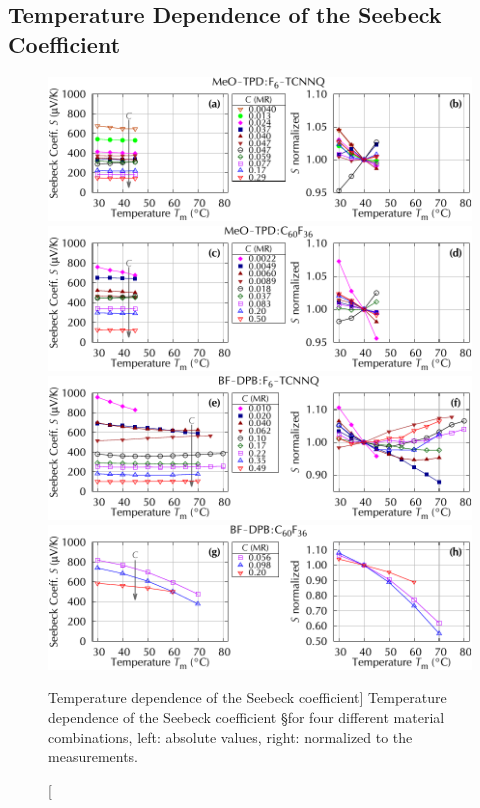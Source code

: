 \subsection{Temperature Dependence of the Seebeck Coefficient}
\label{sec:ResP-S-T}
%
%
\begin{figure}[p]
\centering%
\includegraphics{plot/T-S-p1}\\%
\includegraphics{plot/T-S-p2}\\%
\includegraphics{plot/T-S-p3}\\%
\includegraphics{plot/T-S-p4}\\%
\setcapwidth[c]{\tmCapWidth}%
\caption
[Temperature dependence of the Seebeck coefficient]%
{Temperature dependence of the Seebeck coefficient \S for four different material combinations,
left: absolute values,
right: normalized to the \Tm[40] measurements.
}%
\label{fig:T-S-p-all}
\end{figure}

